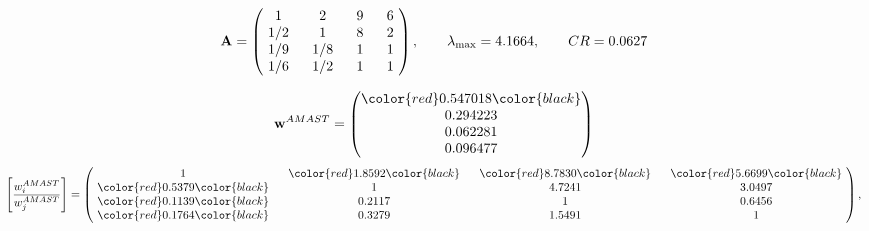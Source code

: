 \begin{example}
\begin{equation*}
\mathbf{A} =
\begin{pmatrix}
$\,\,$ 1 $\,\,$ & $\,\,$2$\,\,$ & $\,\,$9$\,\,$ & $\,\,$6 $\,\,$ \\
$\,\,$ 1/2$\,\,$ & $\,\,$ 1 $\,\,$ & $\,\,$8$\,\,$ & $\,\,$2 $\,\,$ \\
$\,\,$ 1/9$\,\,$ & $\,\,$ 1/8$\,\,$ & $\,\,$ 1 $\,\,$ & $\,\,$1 $\,\,$ \\
$\,\,$ 1/6$\,\,$ & $\,\,$ 1/2$\,\,$ & $\,\,$ 1 $\,\,$ & $\,\,$ 1  $\,\,$ \\
\end{pmatrix},
\qquad
\lambda_{\max} =
4.1664,
\qquad
CR = 0.0627
\end{equation*}

\begin{equation*}
\mathbf{w}^{AMAST} =
\begin{pmatrix}
\color{red} 0.547018\color{black} \\
0.294223\\
0.062281\\
0.096477
\end{pmatrix}\end{equation*}
\begin{equation*}
\left[ \frac{{w}^{AMAST}_i}{{w}^{AMAST}_j} \right] =
\begin{pmatrix}
$\,\,$ 1 $\,\,$ & $\,\,$\color{red} 1.8592\color{black} $\,\,$ & $\,\,$\color{red} 8.7830\color{black} $\,\,$ & $\,\,$\color{red} 5.6699\color{black} $\,\,$ \\
$\,\,$\color{red} 0.5379\color{black} $\,\,$ & $\,\,$ 1 $\,\,$ & $\,\,$4.7241$\,\,$ & $\,\,$3.0497  $\,\,$ \\
$\,\,$\color{red} 0.1139\color{black} $\,\,$ & $\,\,$0.2117$\,\,$ & $\,\,$ 1 $\,\,$ & $\,\,$0.6456 $\,\,$ \\
$\,\,$\color{red} 0.1764\color{black} $\,\,$ & $\,\,$0.3279$\,\,$ & $\,\,$1.5491$\,\,$ & $\,\,$ 1  $\,\,$ \\
\end{pmatrix},
\end{equation*}


\end{example}

